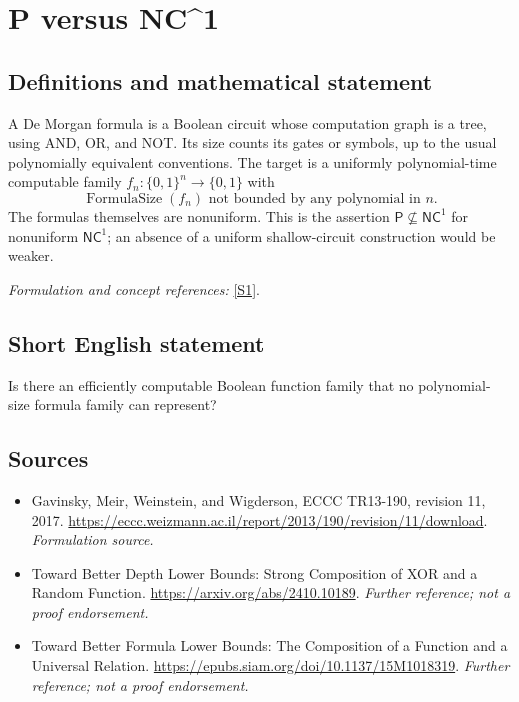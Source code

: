 \documentclass[11pt]{article}
\begin{document}
\section*{\texorpdfstring{P versus NC\textasciicircum{}1}{P versus NC\textasciicircum{}1}}\label{30006707}
\subsection{Definitions and mathematical statement}
A De Morgan formula is a Boolean circuit whose computation graph is a tree, using AND, OR, and NOT. Its size counts its gates or symbols, up to the usual polynomially equivalent conventions. The target is a uniformly polynomial-time computable family $f_n:\{0,1\}^n\to\{0,1\}$ with
\[
 \operatorname{FormulaSize}(f_n)\text{ not bounded by any polynomial in }n.
\]
The formulas themselves are nonuniform. This is the assertion $\mathsf P\nsubseteq\mathsf{NC}^1$ for nonuniform $\mathsf{NC}^1$; an absence of a uniform shallow-circuit construction would be weaker.
\par\smallskip\textit{Formulation and concept references:} \href{https://eccc.weizmann.ac.il/report/2013/190/revision/11/download}{[S1]}.

\subsection{Short English statement}
Is there an efficiently computable Boolean function family that no polynomial-size formula family can represent?
\subsection{Sources}
\begin{itemize}
\item[S1]Gavinsky, Meir, Weinstein, and Wigderson, ECCC TR13-190, revision 11, 2017.
\url{https://eccc.weizmann.ac.il/report/2013/190/revision/11/download}.
\textit{Formulation source.}
\item[S2]Toward Better Depth Lower Bounds: Strong Composition of XOR and a Random Function.
\url{https://arxiv.org/abs/2410.10189}.
\textit{Further reference; not a proof endorsement.}
\item[S3]Toward Better Formula Lower Bounds: The Composition of a Function and a Universal Relation.
\url{https://epubs.siam.org/doi/10.1137/15M1018319}.
\textit{Further reference; not a proof endorsement.}
\end{itemize}
\end{document}
